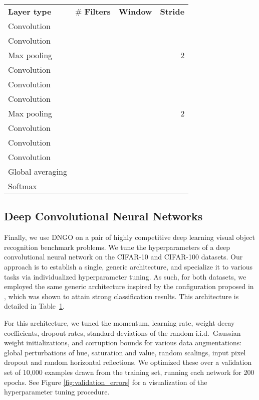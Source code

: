\documentclass{article}
\begin{document}
\begin{table}[t]
  \centering
  \small{
  \begin{tabular}[b]{lrrr}
    \toprule
    {\bf Layer type} & \# {\bf Filters} & {\bf Window} & {\bf Stride}\\\cmidrule(r){1-4}Convolution &  &  & \\
    \cmidrule(r){1-4}Convolution &  &  & \\
    \cmidrule(r){1-4}Max pooling & &  & 2 \\
    \cmidrule(r){1-4}Convolution &  &  & \\
    \cmidrule(r){1-4}Convolution &  &  & \\
    \cmidrule(r){1-4}Convolution &  &  & \\
    \cmidrule(r){1-4}Max pooling & &  & 2 \\
    \cmidrule(r){1-4}Convolution &  &  & \\
    \cmidrule(r){1-4}Convolution &  &  & \\
    \cmidrule(r){1-4}Convolution &  &  & \\
    \cmidrule(r){1-4}Global averaging & &  & \\
    \cmidrule(r){1-4}Softmax & & & \\
   \bottomrule \end{tabular}}
  \captionsetup[table]{position=bottom}
  \label{tab:architecture}
\end{table}

\subsection{Deep Convolutional Neural Networks}
Finally, we use DNGO on a pair of highly competitive deep learning visual object recognition benchmark problems.  We tune the hyperparameters of a deep convolutional neural network on the CIFAR-10 and CIFAR-100 datasets. Our approach is to establish a single, generic architecture, and specialize it to various tasks via individualized hyperparameter tuning. As such, for both datasets, we employed the same generic architecture inspired by the configuration proposed in \citet{DBLP:journals/corr/SpringenbergDBR14}, which was shown to attain strong classification results. This architecture is detailed in Table~\ref{tab:architecture}.

For this architecture, we tuned the momentum, learning rate,  weight decay coefficients, dropout rates, standard deviations of the random i.i.d.\ Gaussian weight initializations, and corruption bounds for various data augmentations: global perturbations of hue, saturation and value, random scalings, input pixel dropout and random horizontal reflections. We optimized these over a validation set of 10,000 examples drawn from the training set, running each network for 200 epochs. See Figure \ref{fig:validation_errors} for a visualization of the hyperparameter tuning procedure.
\end{document}
